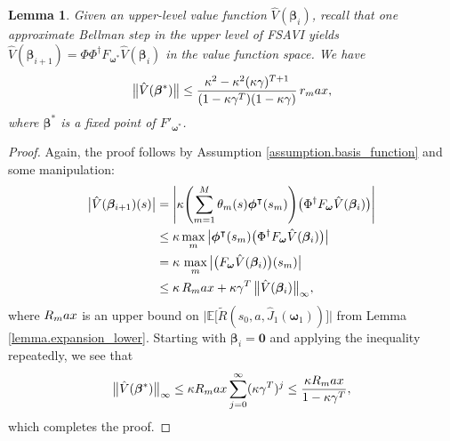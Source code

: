 \documentclass[11pt, notitlepage]{article}
\newcommand{\E}{\mathbb{E}}
\newcommand{\1}{\mathbbm{1}}
\newtheorem{lemma}{Lemma}[section]
\begin{document}
    
\begin{lemma}
\label{lemma.expansion_upper}
Given an upper-level value function $\hat{V}(\boldsymbol{\beta}_{i})$, recall that one approximate Bellman step in the upper level of FSAVI yields $\hat{V}(\boldsymbol{\beta}_{i+1}) = \Phi \Phi^{\dagger} F_{\boldsymbol{\omega}^*} \hat{V}(\boldsymbol{\beta}_{i})$ in the value function space. We have
\[
\bigl \|\hat{V}(\boldsymbol{\beta}^*) \bigr\| \le \frac{\kappa^2 - \kappa^2 (\kappa\gamma)^{T+1}}{(1-\kappa \gamma^T) (1-\kappa\gamma)} \, r_\textnormal{max},
\]
where $\boldsymbol{\beta}^*$ is a fixed point of $F'_{\boldsymbol{\omega}^*}$.
\end{lemma}
\begin{proof}
Again, the proof follows by Assumption \ref{assumption.basis_function} and some manipulation:
\begin{align*}
\bigl|\hat{V}(\boldsymbol{\beta}_{i+1})(s) \bigr|
&= \Biggl| \kappa \Biggl( \sum_{m=1}^M \theta_m(s) \boldsymbol{\phi}^\intercal(s_m) \Biggr) \bigl(\Phi^{\dagger} F_{\boldsymbol{\omega}} \hat{V}(\boldsymbol{\beta}_{i})\bigr) \Biggr| \\
&\le \kappa \max_m \,  \bigl| \boldsymbol{\phi}^\intercal(s_m) \bigl(\Phi^{\dagger} F_{\boldsymbol{\omega}} \hat{V}(\boldsymbol{\beta}_{i}) \bigr) \bigr|\\
&= \kappa \, \max_m \, \bigl|
 \bigl(F_{\boldsymbol{\omega}} \hat{V}(\boldsymbol{\beta}_{i})\bigr)(s_m) \bigr|\\
&\le \kappa \, R_\textnormal{max} + \kappa \gamma^T \, \bigl \| \hat{V}(\boldsymbol{\beta}_{i}) \bigr \|_\infty,
\end{align*}
where $R_\textnormal{max}$ is an upper bound on $\bigl|\E\bigl[\tilde{R}(s_0, a, \hat{J}_1(\boldsymbol{\omega}_1))\bigr]\bigr|$ from Lemma \ref{lemma.expansion_lower}.
Starting with $\boldsymbol{\beta}_{i} = \mathbf{0}$ and applying the inequality repeatedly, we see that
\[
\bigl\|\hat{V}(\boldsymbol{\beta}^*)\bigr\|_\infty \le \kappa R_\textnormal{max} \sum_{j=0}^\infty (\kappa \gamma^T)^j \le \frac{\kappa R_\textnormal{max}}{1-\kappa \gamma^T},
\]
which completes the proof.
\end{proof}
\end{document}
